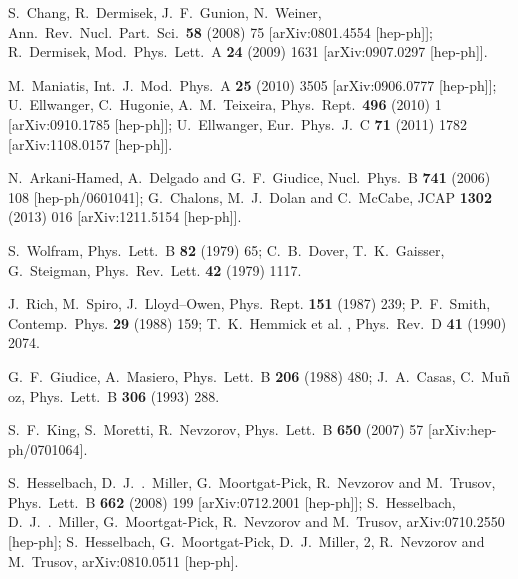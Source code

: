 \documentclass[12pt,a4paper]{article}
\begin{document}
\begin{thebibliography}{999}
S.~Chang, R.~Dermisek, J.~F.~Gunion, N.~Weiner,
Ann.\ Rev.\ Nucl.\ Part.\ Sci.\  {\bf 58} (2008) 75
[arXiv:0801.4554 [hep-ph]];
R.~Dermisek,
Mod.\ Phys.\ Lett.\  A {\bf 24} (2009) 1631
[arXiv:0907.0297 [hep-ph]].

M.~Maniatis,
Int.\ J.\ Mod.\ Phys.\ A {\bf 25} (2010) 3505
[arXiv:0906.0777 [hep-ph]];
U.~Ellwanger, C.~Hugonie, A.~M.~Teixeira,
Phys.\ Rept.\  {\bf 496} (2010) 1
[arXiv:0910.1785 [hep-ph]];
U.~Ellwanger,
Eur.\ Phys.\ J.\ C {\bf 71} (2011) 1782
[arXiv:1108.0157 [hep-ph]].

N.~Arkani-Hamed, A.~Delgado and G.~F.~Giudice,
Nucl.\ Phys.\ B {\bf 741} (2006) 108
[hep-ph/0601041];
G.~Chalons, M.~J.~Dolan and C.~McCabe,
JCAP {\bf 1302} (2013) 016
[arXiv:1211.5154 [hep-ph]].

 S.~Wolfram, Phys.\ Lett.\ B {\bf 82} (1979) 65;
C.~B.~Dover, T.~K.~Gaisser, G.~Steigman, Phys.\ Rev.\ Lett. {\bf 42} (1979) 1117.

 J.~Rich, M.~Spiro, J.~Lloyd--Owen, Phys.\ Rept.  {\bf 151} (1987) 239;
P.~F.~Smith, Contemp.\ Phys.  {\bf 29} (1988) 159; T.~K.~Hemmick et al. ,
Phys.\ Rev.\  D {\bf 41} (1990) 2074.

G.~F.~Giudice, A.~Masiero, Phys.\ Lett.\ B {\bf 206} (1988) 480;
J.~A.~Casas, C.~Mu$\tilde{\rm n}$oz, Phys.\ Lett.\ B {\bf 306} (1993) 288.

S.~F.~King, S.~Moretti, R.~Nevzorov,
Phys.\ Lett.\  B {\bf 650} (2007) 57
[arXiv:hep-ph/0701064].

S.~Hesselbach, D.~J.~.~Miller, G.~Moortgat-Pick, R.~Nevzorov and M.~Trusov,
Phys.\ Lett.\  B {\bf 662} (2008) 199
[arXiv:0712.2001 [hep-ph]];
S.~Hesselbach, D.~J.~.~Miller, G.~Moortgat-Pick, R.~Nevzorov and M.~Trusov,
arXiv:0710.2550 [hep-ph];
S.~Hesselbach, G.~Moortgat-Pick, D.~J.~Miller, 2, R.~Nevzorov and M.~Trusov,
arXiv:0810.0511 [hep-ph].


\end{thebibliography}
\end{document}

